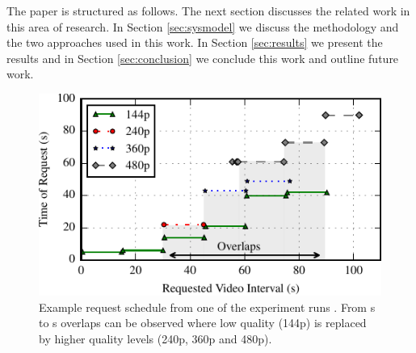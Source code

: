 The paper is structured as follows. The next section discusses the related work in this area of research. 
In Section \ref{sec:sysmodel} we discuss the methodology and the two approaches used in this work.
In Section \ref{sec:results} we present the results and in Section \ref{sec:conclusion} we conclude this work and outline future work.

\begin{figure}[t]
\centering
\includegraphics[width=\columnwidth]{figs/eg_request_schedule}%
\caption{Example request schedule from one of the experiment runs \cite{sieber16sacrificing}. From \unit[30]{s} to \unit[90]{s} overlaps can be observed where low quality (144p) is replaced by higher quality levels (240p, 360p and 480p).}
\label{fig:request_schedule}%
\end{figure}